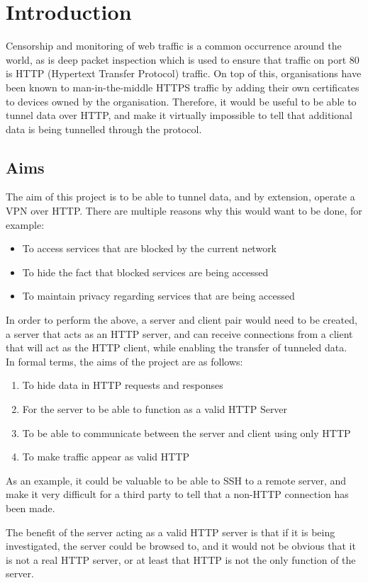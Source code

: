 \section{Introduction}
Censorship and monitoring of web traffic is a common occurrence around the world, as is deep packet inspection which is used to ensure that traffic on port 80 is HTTP (Hypertext Transfer Protocol) traffic.
On top of this, organisations have been known to man-in-the-middle HTTPS traffic by adding their own certificates to devices owned by the organisation.
Therefore, it would be useful to be able to tunnel data over HTTP, and make it virtually impossible to tell that additional data is being tunnelled through the protocol.

\subsection{Aims}
The aim of this project is to be able to tunnel data, and by extension, operate a VPN over HTTP\@. There are multiple reasons why this would want to be done, for example:
\begin{itemize}
    \item To access services that are blocked by the current network
    \item To hide the fact that blocked services are being accessed
    \item To maintain privacy regarding services that are being accessed
\end{itemize}
In order to perform the above, a server and client pair would need to be created, a server that acts as an HTTP server, and can receive connections from a client that will act as the HTTP client, while enabling the transfer of tunneled data.\\
In formal terms, the aims of the project are as follows:
\begin{enumerate}
    \item To hide data in HTTP requests and responses
    \item For the server to be able to function as a valid HTTP Server
    \item To be able to communicate between the server and client using only HTTP
    \item To make traffic appear as valid HTTP
\end{enumerate}
As an example, it could be valuable to be able to SSH to a remote server, and make it very difficult for a third party to tell that a non-HTTP connection has been made.\par
The benefit of the server acting as a valid HTTP server is that if it is being investigated, the server could be browsed to, and it would not be obvious that it is not a real HTTP server, or at least that HTTP is not the only function of the server.

